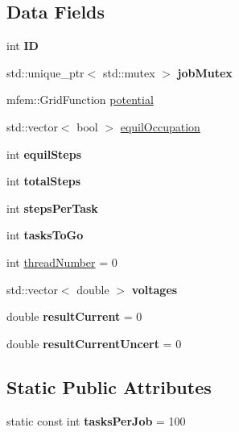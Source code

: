 \subsection*{Data Fields}
\begin{DoxyCompactItemize}
\item 
\mbox{\label{classJob_a57ddffae23fca72e95103d4bf43c2809}} 
int {\bfseries ID}
\item 
\mbox{\label{classJob_ad0d1483df629cd0a619bb7fd6cc48a96}} 
std\+::unique\+\_\+ptr$<$ std\+::mutex $>$ {\bfseries job\+Mutex}
\item 
mfem\+::\+Grid\+Function \hyperlink{classJob_ad2b87bb3cea36a711bf7aace2d0cb338}{potential}
\item 
std\+::vector$<$ bool $>$ \hyperlink{classJob_a0c4579b73aec5c6755f271d78a488ae6}{equil\+Occupation}
\item 
\mbox{\label{classJob_a0de73890acdd2d418ba26eceffbb160c}} 
int {\bfseries equil\+Steps}
\item 
\mbox{\label{classJob_a566a266e422eff68dfdae3e815d30dce}} 
int {\bfseries total\+Steps}
\item 
\mbox{\label{classJob_ace6400f6ae321b8043b055128709644d}} 
int {\bfseries steps\+Per\+Task}
\item 
\mbox{\label{classJob_a52154a755a4faa7b3804ca3c3b32e8bb}} 
int {\bfseries tasks\+To\+Go}
\item 
int \hyperlink{classJob_ae1cfd5a6e867f3664c8f183427a4775a}{thread\+Number} = 0
\item 
\mbox{\label{classJob_af6d86a485ae26abfcdbe130fcd4ede85}} 
std\+::vector$<$ double $>$ {\bfseries voltages}
\item 
\mbox{\label{classJob_a1bb677c94a543ba9c4f4733d8ac4f948}} 
double {\bfseries result\+Current} = 0
\item 
\mbox{\label{classJob_a823bcf86102a4ae9f1c431734547bc62}} 
double {\bfseries result\+Current\+Uncert} = 0
\end{DoxyCompactItemize}
\subsection*{Static Public Attributes}
\begin{DoxyCompactItemize}
\item 
\mbox{\label{classJob_a6db936569b3ad8309a69c8024adb4e09}} 
static const int {\bfseries tasks\+Per\+Job} = 100
\end{DoxyCompactItemize}


